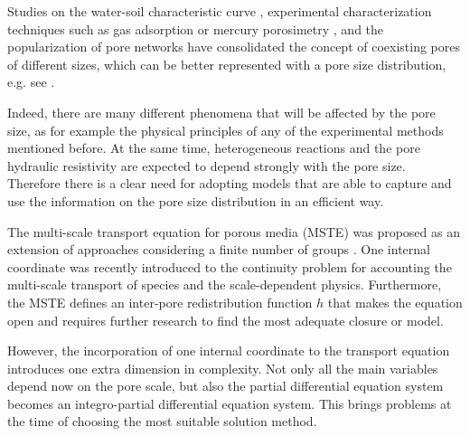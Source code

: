 \documentclass{CFD2011}
\newcommand{\newf}[1]{#1}
\newcommand{\nof}[1]{\textcolor{cyan}{}}
\begin{document}
Studies on the water-soil characteristic curve \citep{durner1994}, experimental characterization techniques such as gas adsorption or mercury porosimetry \citep{Navas,Jaroniec1997,Abell1999}\nof{(nitrogen adsorption and mercury)}\newf{,} and the popularization of pore networks \citep{zhang1994, held2001, oren2002, blunt2002, piri2005, ahrenholz2008, sholokhova2009} have \nof{solidify}\newf{consolidated} the concept of coexisting \nof{different-size }pores\nof{, better represented as the} \newf{of different sizes, which can be better represented with a} pore size distribution, e.g. see \cite{dullien1991}.

Indeed, there are many different phenomena that will be affected by the pore size, as for example the physical principles of any of the experimental methods mentioned before. At the same time, heterogeneous reactions and the pore hydraulic resistivity are expected to depend strongly with the pore size. Therefore there is a clear need for adopting models that are able to capture and use the information on the pore size distribution in an efficient way.

The multi-scale transport equation for porous media (MSTE) was proposed as an extension of approaches considering a finite number of groups \citep{Chen1989, bouffard2001}. One internal coordinate was recently introduced \citep{DupuySchwarz} to the continuity problem for accounting the multi-scale transport of species and the scale-dependent physics. Furthermore, the MSTE defines an inter-pore redistribution function $h$ that makes the equation open and requires further research to find the most adequate closure or model.

However, the incorporation of one internal coordinate to the transport equation introduces one extra dimension in complexity. Not only all the main variables\nof{,} depend now on the pore scale, but \newf{also }the partial differential equation system \nof{is now}\newf{becomes} an integro-partial differential equation system. This brings problems at the time of choosing the most suitable solution method. 

\nof{Many other phenomena in nature can be described by an integro-differential equation with one or many internal coordinates. The Boltzmann transport equation has the molecule velocity as an internal coordinate. The transport equation applied to neutrons or its condensation into the diffusion equation for neutrons use the neutron energy as internal energy. Population balance problems use the particle, bubble or droplet size as internal coordinate. The least square method has been applied succesfully to population balance problems by cite{Dorao05a}.}
\end{document}
